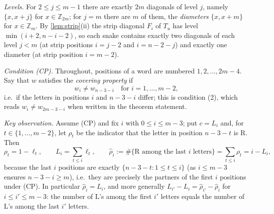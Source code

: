 \documentclass[11pt,a4paper]{article}
\theoremstyle{definition}
\theoremstyle{remark}
\newcommand{\Zd}{\ensuremath{\mathbb{Z}}}
\newcommand{\Li}{\mathrm{L}}
\newcommand{\Ri}{\mathrm{R}}
\begin{document}
\medskip
\noindent\textit{Levels.}  For $2\le j\le m-1$ there are exactly $2m$ diagonals of level
$j$, namely $\{x,x+j\}$ for $x\in\Zd_{2m}$; for $j=m$ there are $m$ of them, the
\emph{diameters} $\{x,x+m\}$ for $x\in\Zd_m$.  By \cref{lem:strip}(ii) the strip diagonal
$F_i$ of $T_u$ has level $\min(i+2,n-i-2)$, so each snake contains exactly two diagonals of
each level $j<m$ (at strip positions $i=j-2$ and $i=n-2-j$) and exactly one diameter (at
strip position $i=m-2$).

\medskip
\noindent\textit{Condition \textup{(CP)}.}  Throughout, positions of a word are numbered
$1,2,\dots,2m-4$.  Say that $w$ satisfies the \emph{covering property} if
\[
  w_i \ne w_{n-3-i}\quad\text{for } i=1,\dots,m-2, \tag{CP}
\]
i.e.\ if the letters in positions $i$ and $n-3-i$ differ; this is condition (2), which
reads $w_i\ne w_{2m-3-i}$ when written in the theorem statement.

\medskip
\noindent\textit{Key observation.}  Assume (CP) and fix $i$ with $0\le i\le m-3$; put
$c=L_i$ and, for $t\in\{1,\dots,m-2\}$, let $\rho_t$ be the indicator that the letter in
position $n-3-t$ is $\Ri$.  Then
\[
  \rho_t=1-\ell_t,\qquad
  L_i=\sum_{t\le i}\ell_t,\qquad
  \widehat{\rho}_i:=\#\{\Ri\text{ among the last } i \text{ letters}\}
     =\sum_{t\le i}\rho_t=i-L_i , \tag{3}
\]
because the last $i$ positions are exactly $\{n-3-t:1\le t\le i\}$ (as $i\le m-3$ ensures
$n-3-i\ge m$), i.e.\ they are precisely the partners of the first $i$ positions under
(CP).  In particular $\widehat\rho_i=L_i$, and more generally
$L_{i'}-L_i=\widehat\rho_{i'}-\widehat\rho_i$ for $i\le i'\le m-3$: the number of $\Li$'s
among the first $i'$ letters equals the number of $\Li$'s among the last $i'$ letters.
\end{document}
